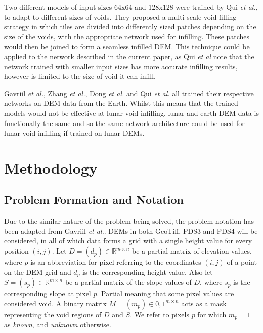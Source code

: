 \documentclass[twocolumn]{article}
\begin{document}
Two different models of input sizes 64x64 and 128x128 were trained by Qui \emph{et al.}, to adapt to different sizes of voids.
They proposed a multi-scale void filling strategy in which tiles are divided into differently sized patches depending on the size of the voids, with the appropriate network used for infilling.
These patches would then be joined to form a seamless infilled DEM.
This technique could be applied to the network described in the current paper, as Qui \emph{et al} note that the network trained with smaller input sizes has more accurate infilling results, however is limited to the size of void it can infill.

Gavriil \emph{et al.}, Zhang \emph{et al.}, Dong \emph{et al.} and Qui \emph{et al.} all trained their respective networks on DEM data from the Earth.
Whilst this means that the trained models would not be effective at lunar void infilling, lunar and earth DEM data is functionally the same and so the same network architecture could be used for lunar void infilling if trained on lunar DEMs.


\section{Methodology}
\label{sec:org2bd751c}

\subsection{Problem Formation and Notation}
\label{sec:orga27d0b4}

Due to the similar nature of the problem being solved, the problem notation has been adapted from Gavriil \emph{et al.}\autocite{gavriilVoidFillingDigital2019}.
DEMs in both GeoTiff, PDS3 and PDS4 will be considered, in all of which data forms a grid with a single height value for every position \((i, j)\).
Let \(D = (d_p) \in \mathbb{R}^{m \times n}\) be a partial matrix of elevation values, where \(p\) is an abbreviation for pixel referring to the coordinates \((i,j)\) of a point on the DEM grid and \(d_p\) is the corresponding height value.
Also let \(S = (s_p) \in \mathbb{R}^{m \times n}\) be a partial matrix of the slope values of \(D\), where \(s_p\) is the corresponding slope at pixel \(p\).
Partial meaning that some pixel values are considered void.
A binary matrix \(M = (m_p) \in 0,1^{m \times n}\) acts as a mask representing the void regions of \(D\) and \(S\).
We refer to pixels \(p\) for which \(m_p = 1\) as \emph{known}, and \emph{unknown} otherwise.
\end{document}
